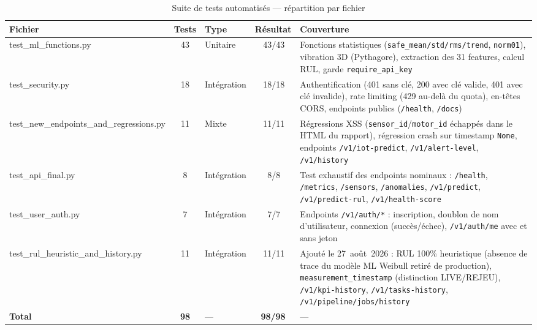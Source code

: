 \documentclass[12pt,a4paper]{report}
\newcommand{\cmark}{\ding{51}}
\begin{document}
\begin{table}[H]
\centering
\caption{Suite de tests automatisés — répartition par fichier}
\label{tab:tests_suite}
\footnotesize
{}
\begin{tabularx}{\textwidth}{>{\ttfamily\raggedright\arraybackslash}p{3.1cm}c>{\raggedright\arraybackslash}p{1.6cm}c>{\raggedright\arraybackslash}X}
\toprule
\textbf{\normalfont Fichier} & \textbf{Tests} & \textbf{Type} & \textbf{Résultat} & \textbf{Couverture} \\
\midrule
test\_ml\_functions.py & 43 & Unitaire &
  \cmark\,43/43 &
  Fonctions statistiques (\texttt{safe\_mean/std/rms/trend}, \texttt{norm01}), vibration
  3D (Pythagore), extraction des 31 features, calcul RUL, garde \texttt{require\_api\_key} \\
test\_security.py & 18 & Intégration &
  \cmark\,18/18 &
  Authentification (401 sans clé, 200 avec clé valide, 401 avec clé invalide), rate
  limiting (429 au-delà du quota), en-têtes CORS, endpoints publics (\texttt{/health},
  \texttt{/docs}) \\
test\_new\_endpoints\_\allowbreak and\_regressions.py & 11 & Mixte &
  \cmark\,11/11 &
  Régressions XSS (\texttt{sensor\_id}/\texttt{motor\_id} échappés dans le HTML du
  rapport), régression crash sur timestamp \texttt{None}, endpoints
  \texttt{/v1/iot-predict}, \texttt{/v1/alert-level}, \texttt{/v1/history} \\
test\_api\_final.py & 8 & Intégration &
  \cmark\,8/8 &
  Test exhaustif des endpoints nominaux : \texttt{/health}, \texttt{/metrics},
  \texttt{/sensors}, \texttt{/anomalies}, \texttt{/v1/predict}, \texttt{/v1/predict-rul},
  \texttt{/v1/health-score} \\
test\_user\_auth.py & 7 & Intégration &
  \cmark\,7/7 &
  Endpoints \texttt{/v1/auth/*} : inscription, doublon de nom d'utilisateur, connexion
  (succès/échec), \texttt{/v1/auth/me} avec et sans jeton \\
test\_rul\_heuristic\_\allowbreak and\_history.py & 11 & Intégration &
  \cmark\,11/11 &
  Ajouté le 27~août~2026 : RUL 100\% heuristique (absence de trace du modèle ML Weibull
  retiré de production), \texttt{measurement\_timestamp} (distinction LIVE/REJEU),
  \texttt{/v1/kpi-history}, \texttt{/v1/tasks-history}, \texttt{/v1/pipeline/jobs/history} \\
\midrule
\textbf{\normalfont Total} & \textbf{98} & — & \textbf{98/98} & — \\
\bottomrule
\end{tabularx}
\end{table}
\end{document}
